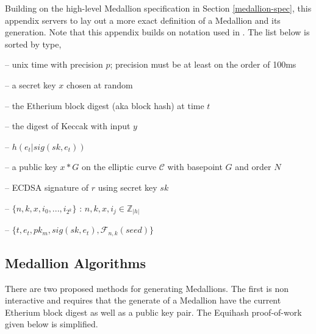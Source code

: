 
Building on the high-level Medallion specification in Section \ref{medallion-spec}, this appendix servers to lay out a more exact definition of a Medallion and its generation. Note that this appendix builds on notation used in \cite{Equihash}. The list below is sorted by type,
\begin{description}[align=right, labelwidth=2.7cm]
	\item[$t$ (uint)] -- unix time with precision $p$; precision must be at least on the order of 100ms
	\item[$sk_m$ (uint)]  -- a secret key $x$ chosen at random
    \item[$e_t$ (uint)]  -- the Etherium block digest (aka block hash) at time $t$ 
    \item[$h(y)$ (uint)]  -- the digest of Keccak with input $y$
    \item[$seed$ (uint)]  -- $h(e_t|sig(sk,e_t))$
    \item[$pk_m$ (tuple)]  -- a public key $x*G$ on the elliptic curve $\mathcal{C}$ with basepoint $G$ and order $N$
    \item[$sig(sk, r)$ (tuple)]  -- ECDSA signature of $r$ using secret key $sk$
    \item[$\mathcal{F}_{n,k}(x)$ (struct)] -- $\{n, k, x, i_0, ..., i_{2^{k}} \}$ : $n,k,x,i_j \in\mathbb{Z}_{|h|}$
	\item[$\mathcal{M}$ (struct)] -- $\{t, e_t, pk_m, sig(sk,e_t), \mathcal{F}_{n,k}(seed)\}$
\end{description}

\subsection*{Medallion Algorithms}

There are two proposed methods for generating Medallions. The first is non interactive and requires that the generate of a Medallion have the current Etherium block digest as well as a public key pair. The Equihash proof-of-work given below is simplified.

